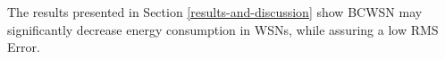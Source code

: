 \documentclass{acm_proc_article-sp}
\begin{document}
The results presented in Section \ref{results-and-discussion} show BCWSN may significantly decrease energy consumption in WSNs, while
assuring a low RMS Error.
\vspace*{-.3cm}





  
\end{document}

